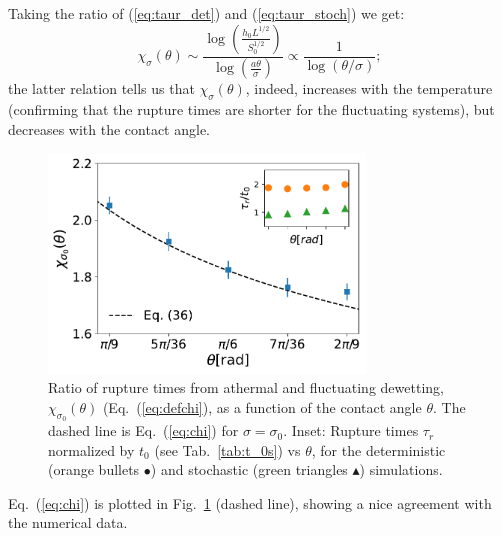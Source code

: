 Taking the ratio of (\ref{eq:taur_det}) and (\ref{eq:taur_stoch}) we get:
\begin{equation}\label{eq:chi}
    \chi_{\sigma}(\theta) \sim \frac{\log\left(\frac{h_0 L^{1/2}}{S_0^{1/2}}\right)}{\log\left(\frac{a \theta}{\sigma}\right)} \propto \frac{1}{\log(\theta/\sigma)};
\end{equation}
the latter relation tells us that $\chi_{\sigma}(\theta)$, indeed, increases with the temperature (confirming that the rupture times are shorter for the fluctuating systems), but decreases with the contact angle.
\begin{figure}
    \centering
    \includegraphics[width=0.75\textwidth]{graphics/Andrea_model_t0_normed_rupture_times.pdf}
    \caption{Ratio of rupture times from athermal and fluctuating 
    dewetting, $\chi_{\sigma_0}(\theta)$ (Eq.~(\ref{eq:defchi}), as a function of the contact angle 
    $\theta$. The dashed line is Eq.~(\ref{eq:chi}) for $\sigma=\sigma_0$.
    Inset: Rupture times $\tau_r$ normalized by $t_0$ (see Tab.~\ref{tab:t_0s}) vs $\theta$, 
    for the deterministic (orange bullets \textcolor{pyorange}{$\bullet$}) and stochastic 
    (green triangles  \textcolor{pygreen}{$\blacktriangle$}) simulations.
    }
    \label{fig:rupture_times_semilogy_more_theta}
\end{figure}
Eq.~(\ref{eq:chi}) is plotted in Fig.~\ref{fig:rupture_times_semilogy_more_theta} (dashed line), showing a nice agreement with the numerical data.
